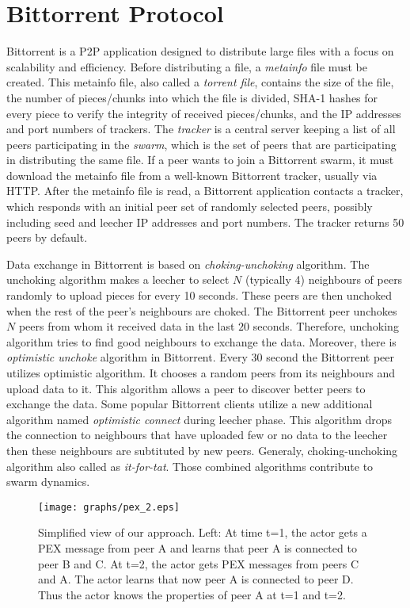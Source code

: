 \documentclass[paper]{ieice}
\begin{document}
\section{Bittorrent Protocol}\label{background}
Bittorrent is a P2P application designed to distribute large files with a focus on scalability and efficiency.  
Before distributing a file, a \textit{metainfo} file must be created.  
This metainfo file, also called a \textit{torrent file}, contains the size of the file, the number of pieces/chunks into which the file is divided, SHA-1 hashes for every piece to verify the integrity of received pieces/chunks, and the IP addresses and port numbers of trackers.  
The \textit{tracker} is a central server keeping a list of all peers participating in the \textit{swarm}, which is the set of peers that are participating in distributing the same file.  
If a peer wants to join a Bittorrent swarm, it must download the metainfo file from a well-known Bittorrent tracker, usually via HTTP. 
After the metainfo file is read, a Bittorrent application contacts a tracker, which responds with an initial peer set of randomly selected peers, possibly including seed and leecher IP addresses and port numbers.  
The tracker returns 50 peers by default.

Data exchange in Bittorrent is based on \textit{choking-unchoking} algorithm.
The unchoking algorithm makes a leecher to select $N$ (typically 4) neighbours of peers randomly to upload pieces for every 10 seconds.
These peers are then unchoked when the rest of the peer's neighbours are choked. 
The Bittorrent peer unchokes $N$ peers from whom it received data in the last $20$ seconds.
Therefore, unchoking algorithm tries to find good neighbours to exchange the data. 
Moreover, there is \textit{optimistic unchoke} algorithm in Bittorrent. 
Every $30$ second the Bittorrent peer utilizes optimistic algorithm. 
It chooses a random peers from its neighbours and upload data to it. 
This algorithm allows a peer to discover better peers to exchange the data. 
Some popular Bittorrent clients utilize a new additional algorithm named \textit{optimistic connect} during leecher phase. 
This algorithm drops the connection to neighbours that have uploaded few or no data to the leecher then these neighbours are subtituted by new peers.
Generaly, choking-unchoking algorithm also called as \textit{it-for-tat}. 
Those combined algorithms contribute to swarm dynamics.  

\begin{figure}[tb]
\begin{center}
\texttt{[image: graphs/pex\_2.eps]}
\end{center}
\caption{Simplified view of our approach. Left: At time t=1, the actor gets a PEX message from peer A and
learns that peer A is connected to peer B and C. At t=2, the actor gets  PEX messages from peers C and A. The actor
learns that now peer A is connected to peer D. Thus the actor knows the properties of peer A at t=1 and t=2.} 
\label{fig:pexworks}
\vspace{-2mm}
\end{figure}
\end{document}
